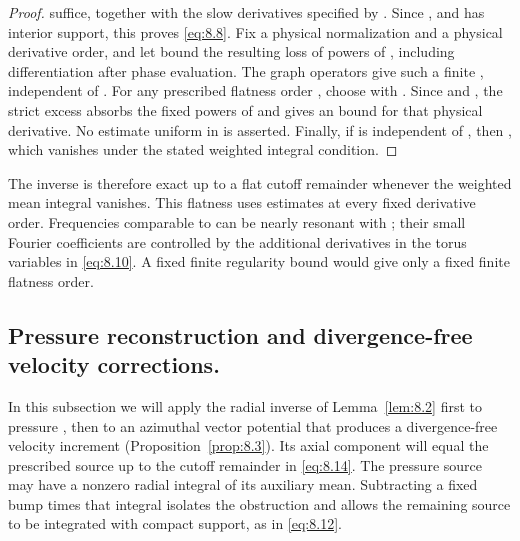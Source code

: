 \begin{proof}
 suffice, together with the slow derivatives specified by
. Since
, and
 has interior support, this proves \eqref{eq:8.8}. Fix a
physical normalization and a physical derivative order, and let 
bound the resulting loss of powers of , including differentiation after
phase evaluation. The graph operators give such a finite , independent of
. For any prescribed flatness order , choose
 with
. Since
 and , the strict excess
absorbs the fixed powers of  and gives an
 bound for that physical derivative. No estimate uniform in
 is asserted. Finally, if  is independent of
, then
, which vanishes under the stated weighted
integral condition.
\end{proof}

The inverse is therefore exact up to a flat cutoff remainder whenever the weighted mean integral
vanishes. This flatness uses estimates at every fixed derivative order. Frequencies comparable to
 can be nearly resonant with ; their small Fourier
coefficients are controlled by the additional derivatives in the torus variables in \eqref{eq:8.10}.
A fixed finite regularity bound would give only a fixed finite flatness order.

\subsection{Pressure reconstruction and divergence-free velocity corrections.}\label{sec:8.3}
In this subsection we will apply the radial inverse of Lemma~\ref{lem:8.2} first to pressure
, then to an azimuthal vector potential that produces a divergence-free
velocity increment (Proposition~\ref{prop:8.3}). Its axial component will equal the prescribed
source  up to the cutoff remainder in \eqref{eq:8.14}. The pressure
source may have a nonzero radial integral of its auxiliary mean. Subtracting a fixed bump times that
integral isolates the obstruction and allows the remaining source to be integrated with compact
support, as in \eqref{eq:8.12}.

